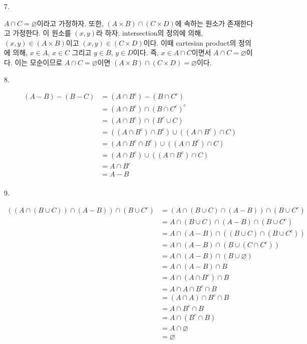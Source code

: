\documentclass{article}
\begin{document}
7.
\begin{addmargin}[1em]{2em}
$A\cap C = \varnothing$이라고 가정하자. 또한, $(A\times B)\cap (C\times D)$에 속하는 원소가 존재한다고 가정한다. 이 원소를 $(x, y)$라 하자. intersection의 정의에 의해, $(x,y) \in (A\times B)$이고 $(x, y) \in (C\times D)$이다. 이때 cartesian product의 정의에 의해, $x\in A$, $x\in C$ 그리고 $y\in B$, $y\in D$이다. 즉, $x \in A\cap C$이면서 $A\cap C = \varnothing$이다. 이는 모순이므로 $A\cap C = \varnothing$이면 $(A \times B) \cap (C \times D) = \varnothing$이다.

\end{addmargin}
\bigskip

8.
\begin{addmargin}[1em]{2em}
\begin{align*}
    (A-B)-(B-C)&=(A\cap B^c)-(B\cap C^c) \\
    &=(A\cap B^c)\cap(B\cap C^c)^c \\
    &=(A\cap B^c)\cap(B^c\cup C) \\
    &=((A\cap B^c)\cap B^c)\cup((A\cap B^c)\cap C) \\
    &=(A\cap B^c\cap B^c)\cup((A\cap B^c)\cap C) \\
    &=(A\cap B^c)\cup((A\cap B^c)\cap C) \\
    &=A\cap B^c \\
    &=A-B \\
\end{align*}
\end{addmargin}
\bigskip

9.
\begin{addmargin}[1em]{2em}
\begin{align*}
    ((A\cap(B\cup C))\cap (A-B))\cap(B\cup C^c) &= (A\cap(B\cup C)\cap (A-B))\cap(B\cup C^c) \\
    &= A\cap(B\cup C)\cap (A-B)\cap(B\cup C^c) \\
    &= A\cap(A-B)\cap((B\cup C)\cap (B\cup C^c)) \\
    &= A\cap(A-B)\cap (B\cup (C\cap C^c)) \\
    &= A\cap(A-B)\cap (B\cup \varnothing) \\
    &= A\cap(A-B)\cap B \\
    &= A\cap(A\cap B^c)\cap B \\
    &= A\cap A\cap B^c\cap B \\
    &= (A\cap A)\cap B^c\cap B \\
    &= A\cap B^c\cap B \\
    &= A\cap (B^c\cap B) \\
    &= A\cap \varnothing \\
    &= \varnothing \\
\end{align*}
\end{addmargin}
\bigskip
\end{document}
